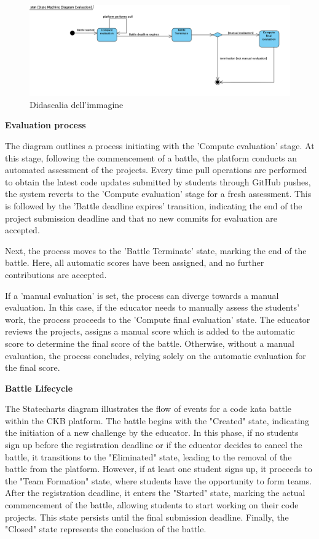     \begin{figure}[H]
  \includegraphics[width=1\linewidth]{StateChart/EvaluationStateChart.png} 
  \caption{Didascalia dell'immagine}
  \label{fig:immagine}
\end{figure}

\newpage

\textbf{Evaluation process}



\noindent The diagram outlines a process initiating with the 'Compute evaluation' stage. At this stage, following the commencement of a battle, the platform conducts an automated assessment of the projects. Every time pull operations are performed to obtain the latest code updates submitted by students through GitHub pushes, the system reverts to the 'Compute evaluation' stage for a fresh assessment.
This is followed by the 'Battle deadline expires' transition, indicating the end of the project submission deadline and that no new commits for evaluation are accepted.

\noindent Next, the process moves to the 'Battle Terminate' state, marking the end of the battle. Here, all automatic scores have been assigned, and no further contributions are accepted.

\noindent If a 'manual evaluation' is set, the process can diverge towards a manual evaluation. In this case, if the educator needs to manually assess the students' work, the process proceeds to the 'Compute final evaluation' state. The educator reviews the projects, assigns a manual score which is added to the automatic score to determine the final score of the battle. Otherwise, without a manual evaluation, the process concludes, relying solely on the automatic evaluation for the final score.


\textbf{Battle Lifecycle }


\noindent The Statecharts diagram illustrates the flow of events for a code kata battle within the CKB platform. The battle begins with the "Created" state, indicating the initiation of a new challenge by the educator. In this phase, if no students sign up before the registration deadline or if the educator decides to cancel the battle, it transitions to the "Eliminated" state, leading to the removal of the battle from the platform. However, if at least one student signs up, it proceeds to the "Team Formation" state, where students have the opportunity to form teams. After the registration deadline, it enters the "Started" state, marking the actual commencement of the battle, allowing students to start working on their code projects. This state persists until the final submission deadline. Finally, the "Closed" state represents the conclusion of the battle.
